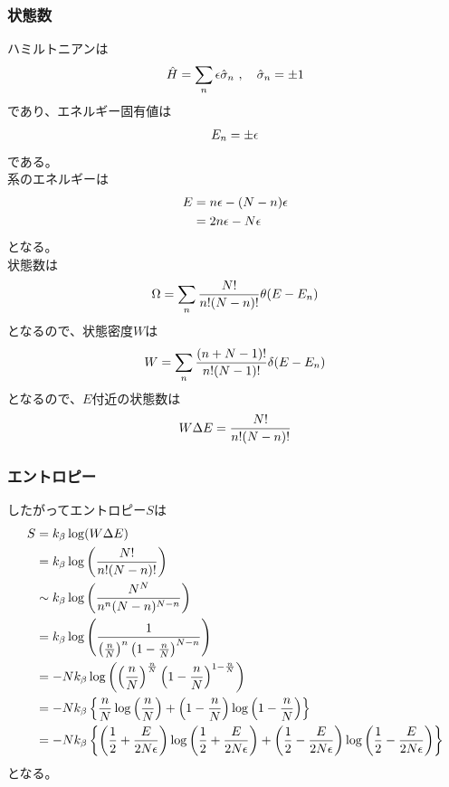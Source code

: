 \documentclass{jsarticle}  %
\numberwithin{equation}{section} %
\numberwithin{figure}{section}
\begin{document}
\subsubsection{状態数}
    ハミルトニアンは
    \begin{align}
        \hat{H} = \sum_n \epsilon \hat{\sigma}_n\ , \quad \hat{\sigma}_n = \pm 1 \notag 
    \end{align}
    であり、エネルギー固有値は
    \begin{align}
        E_n = \pm \epsilon \notag  
    \end{align}
    である。\\
    系のエネルギーは
    \begin{align}
        E &= n\epsilon - (N - n)\epsilon \notag \\
        &= 2n\epsilon - N \epsilon \notag 
    \end{align}
    となる。\\
    状態数は
    \begin{align}
        \Omega = \sum_n \frac{N!}{n!(N-n)!} \theta (E - E_n) \notag 
    \end{align}
    となるので、状態密度$W$は
    \begin{align}
        W = \sum_n \frac{(n+N-1)!}{n!(N-1)!} \delta(E-E_n) \notag 
    \end{align}
    となるので、$E$付近の状態数は
    \begin{align}
        W \Delta E = \frac{N!}{n!(N-n)!} \notag 
    \end{align}
\subsubsection{エントロピー}
    したがってエントロピー$S$は
    \begin{align}
        S &= k_\beta \log(W \Delta E) \notag \\
        &= k_\beta \log \left( \frac{N!}{n!(N-n)!} \right) \notag \\
        &\sim k_\beta \log \left( \frac{N^N}{n^n (N -n)^{N-n}} \right) \notag \\
        &= k_\beta \log \left( \frac{1}{\left( \frac{n}{N} \right)^n \left( 1 - \frac{n}{N} \right)^{N-n}} \right) \notag \\
        &= -Nk_\beta \log \left( \left( \frac{n}{N} \right)^\frac{n}{N} \left( 1 - \frac{n}{N} \right)^{1-\frac{n}{N}} \right) \notag \\
        &= -Nk_\beta \left\{ \frac{n}{N} \log \left( \frac{n}{N} \right) + \left( 1 - \frac{n}{N} \right) \log \left( 1 - \frac{n}{N} \right) \right\} \notag \\
        &= -Nk_\beta \left\{ \left( \frac{1}{2} + \frac{E}{2N\epsilon} \right) \log \left( \frac{1}{2} + \frac{E}{2N\epsilon} \right) + \left( \frac{1}{2} - \frac{E}{2N\epsilon} \right) \log \left( \frac{1}{2} - \frac{E}{2N\epsilon} \right) \right\} \notag 
    \end{align}
    となる。
\end{document}
